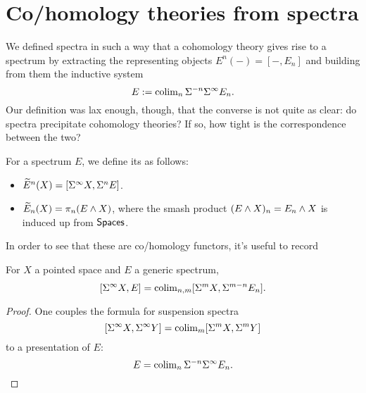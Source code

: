 \section{Co/homology theories from spectra}

We defined spectra in such a way that a cohomology theory gives rise to a spectrum by extracting the representing objects $E^n(-) = [-, E_n]$ and building from them the inductive system \[E := \operatorname{colim}_n \Sigma^{-n} \Sigma^\infty E_n.\]
Our definition was lax enough, though, that the converse is not quite as clear: do spectra precipitate cohomology theories?
If so, how tight is the correspondence between the two?

\begin{definition}
For a spectrum $E$, we define its  as follows:
\begin{itemize}
    \item $\widetilde E^n(X) = [\Sigma^\infty X, \Sigma^n E]$.
    \item $\widetilde E_n(X) = \pi_n(E \wedge X)$, where the smash product $(E \wedge X)_n =  E_n \wedge X$ is induced up from $\mathsf{Spaces}$.
\end{itemize}
\end{definition}

In order to see that these are co/homology functors, it's useful to record
\begin{lemma}
%
For $X$ a pointed space and $E$ a generic spectrum,%
\[[\Sigma^\infty X, E] = \operatorname{colim}_{n,m} [\Sigma^m X, \Sigma^{m-n} E_n].\]
\end{lemma}
\begin{proof}
One couples the formula for suspension spectra \[[\Sigma^\infty X, \Sigma^\infty Y] = \operatorname{colim}_m [\Sigma^m X, \Sigma^m Y]\] to a presentation of $E$: \[E = \operatorname{colim}_n \Sigma^{-n} \Sigma^\infty E_n. \qedhere\]
\end{proof}

